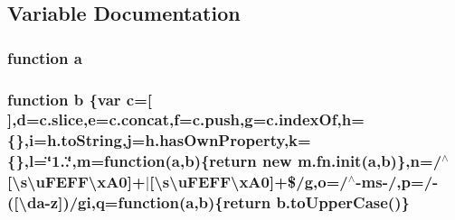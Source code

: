 \subsection{Variable Documentation}
\hypertarget{root_2static_2root_2js_2jquery-1_811_81_8min_8js_aa4d4888597588a84fd5b1184d00c91f3}{
\subsubsection[{a}]{\setlength{\rightskip}{0pt plus 5cm}function a}}\label{root_2static_2root_2js_2jquery-1_811_81_8min_8js_aa4d4888597588a84fd5b1184d00c91f3}
\hypertarget{root_2static_2root_2js_2jquery-1_811_81_8min_8js_ac0431efac4d7c393d1e70b86115cb93f}{
\subsubsection[{b}]{\setlength{\rightskip}{0pt plus 5cm}function b \{var {\bf c}=\mbox{[}$\,$\mbox{]},{\bf d}=c.\-slice,{\bf e}=c.\-concat,{\bf f}=c.\-push,{\bf g}=c.\-index\-Of,{\bf h}=\{\},{\bf i}=h.\-to\-String,{\bf j}=h.\-has\-Own\-Property,{\bf k}=\{\},{\bf l}=\char`\"{}1..\char`\"{},{\bf m}=function({\bf a},b)\{return new {\bf m.\-fn.\-init}({\bf a},b)\},{\bf n}=/$^\wedge$\mbox{[}\textbackslash{}s\textbackslash{}u\-F\-E\-F\-F\textbackslash{}x\-A0\mbox{]}+$\vert$\mbox{[}\textbackslash{}s\textbackslash{}u\-F\-E\-F\-F\textbackslash{}x\-A0\mbox{]}+\$/{\bf g},{\bf o}=/$^\wedge$-\/ms-\//,{\bf p}=/-\/(\mbox{[}\textbackslash{}da-\/z\mbox{]})/gi,q=function({\bf a},b)\{return b.\-to\-Upper\-Case()\}}}\label{root_2static_2root_2js_2jquery-1_811_81_8min_8js_ac0431efac4d7c393d1e70b86115cb93f}
